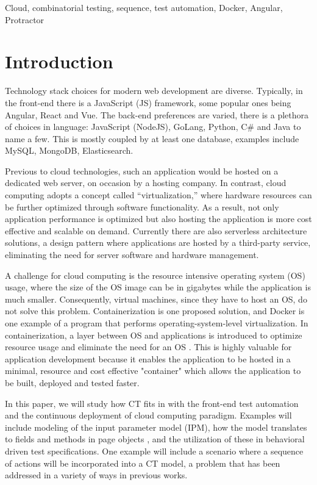 \documentclass[conference]{IEEEtran}
\begin{document}
\begin{IEEEkeywords}
Cloud, combinatorial testing, sequence, test automation, Docker, Angular, Protractor
\end{IEEEkeywords}

\section{Introduction}
Technology stack choices for modern web development are diverse. 
Typically, in the front-end there is a JavaScript (JS) framework, some popular ones being Angular, React and Vue.
The back-end preferences are varied, there is a plethora of choices in language: JavaScript (NodeJS), GoLang, Python, C\# and Java to name a few. 
This is mostly coupled by at least one database, examples include MySQL, MongoDB, Elasticsearch.

Previous to cloud technologies, such an application would be hosted on a dedicated web server, on occasion by a hosting company.
In contrast, cloud computing adopts a concept called “virtualization,” where hardware resources can be further optimized through software functionality.
As a result, not only application performance is optimized but also hosting the application is more cost effective and scalable on demand.
Currently there are also serverless architecture solutions, a design pattern where applications are hosted by a third-party service, eliminating the need for server software and hardware management.

A challenge for cloud computing is the resource intensive operating system (OS) usage, where the size of the OS image can be in gigabytes while the application is much smaller. 
Consequently, virtual machines, since they have to host an OS, do not solve this problem.
Containerization is one proposed solution, and Docker is one example of a program that performs operating-system-level virtualization. 
In containerization, a layer between OS and applications is introduced to optimize resource usage and eliminate the need for an OS \cite{wiki:docker}.
This is highly valuable for application development because it enables the application to be hosted in a minimal, resource and cost effective "container" which 
allows the application to be built, deployed and tested faster.

In this paper, we will study how CT fits in with the front-end test automation and the continuous deployment of cloud computing paradigm.
Examples will include modeling of the input parameter model (IPM), how the model translates to fields and methods in page objects \cite{fowler:pageobject}, 
and the utilization of these in behavioral driven test specifications.
One example will include a scenario where a sequence of actions will be incorporated into a CT model, a problem that has been addressed in a variety of ways in previous works.
\end{document}

